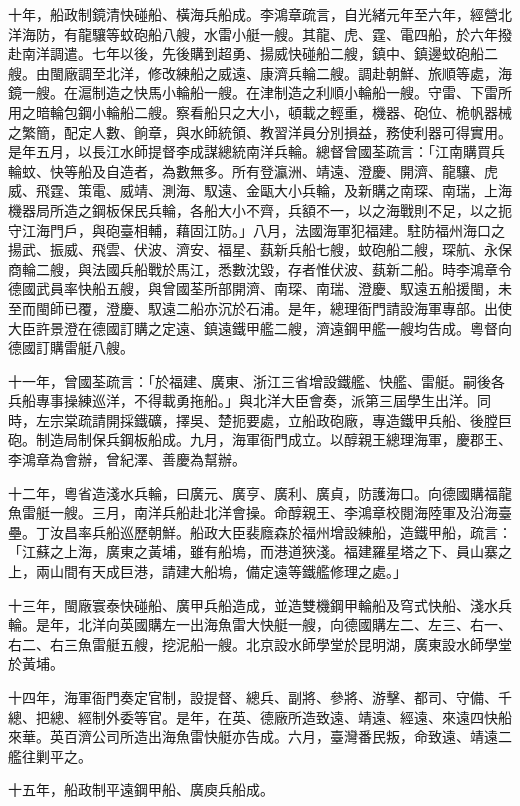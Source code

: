 \begin{pinyinscope}
十年，船政制鏡清快碰船、橫海兵船成。李鴻章疏言，自光緒元年至六年，經營北洋海防，有龍驤等蚊砲船八艘，水雷小艇一艘。其龍、虎、霆、電四船，於六年撥赴南洋調遣。七年以後，先後購到超勇、揚威快碰船二艘，鎮中、鎮邊蚊砲船二艘。由閩廠調至北洋，修改練船之威遠、康濟兵輪二艘。調赴朝鮮、旅順等處，海鏡一艘。在滬制造之快馬小輪船一艘。在津制造之利順小輪船一艘。守雷、下雷所用之暗輪包鋼小輪船二艘。察看船只之大小，頓載之輕重，機器、砲位、桅帆器械之繁簡，配定人數、餉章，與水師統領、教習洋員分別損益，務使利器可得實用。是年五月，以長江水師提督李成謀總統南洋兵輪。總督曾國荃疏言：「江南購買兵輪蚊、快等船及自造者，為數無多。所有登瀛洲、靖遠、澄慶、開濟、龍驤、虎威、飛霆、策電、威靖、測海、馭遠、金甌大小兵輪，及新購之南琛、南瑞，上海機器局所造之鋼板保民兵輪，各船大小不齊，兵額不一，以之海戰則不足，以之扼守江海門戶，與砲臺相輔，藉固江防。」八月，法國海軍犯福建。駐防福州海口之揚武、振威、飛雲、伏波、濟安、福星、蓺新兵船七艘，蚊砲船二艘，琛航、永保商輪二艘，與法國兵船戰於馬江，悉數沈毀，存者惟伏波、蓺新二船。時李鴻章令德國武員率快船五艘，與曾國荃所部開濟、南琛、南瑞、澄慶、馭遠五船援閩，未至而閩師已覆，澄慶、馭遠二船亦沉於石浦。是年，總理衙門請設海軍專部。出使大臣許景澄在德國訂購之定遠、鎮遠鐵甲艦二艘，濟遠鋼甲艦一艘均告成。粵督向德國訂購雷艇八艘。

十一年，曾國荃疏言：「於福建、廣東、浙江三省增設鐵艦、快艦、雷艇。嗣後各兵船專事操練巡洋，不得載勇拖船。」與北洋大臣會奏，派第三屆學生出洋。同時，左宗棠疏請開採鐵礦，擇吳、楚扼要處，立船政砲廠，專造鐵甲兵船、後膛巨砲。制造局制保兵鋼板船成。九月，海軍衙門成立。以醇親王總理海軍，慶郡王、李鴻章為會辦，曾紀澤、善慶為幫辦。

十二年，粵省造淺水兵輪，曰廣元、廣亨、廣利、廣貞，防護海口。向德國購福龍魚雷艇一艘。三月，南洋兵船赴北洋會操。命醇親王、李鴻章校閱海陸軍及沿海臺壘。丁汝昌率兵船巡歷朝鮮。船政大臣裴廕森於福州增設練船，造鐵甲船，疏言：「江蘇之上海，廣東之黃埔，雖有船塢，而港道狹淺。福建羅星塔之下、員山寨之上，兩山間有天成巨港，請建大船塢，備定遠等鐵艦修理之處。」

十三年，閩廠寰泰快碰船、廣甲兵船造成，並造雙機鋼甲輪船及穹式快船、淺水兵輪。是年，北洋向英國購左一出海魚雷大快艇一艘，向德國購左二、左三、右一、右二、右三魚雷艇五艘，挖泥船一艘。北京設水師學堂於昆明湖，廣東設水師學堂於黃埔。

十四年，海軍衙門奏定官制，設提督、總兵、副將、參將、游擊、都司、守備、千總、把總、經制外委等官。是年，在英、德廠所造致遠、靖遠、經遠、來遠四快船來華。英百濟公司所造出海魚雷快艇亦告成。六月，臺灣番民叛，命致遠、靖遠二艦往剿平之。

十五年，船政制平遠鋼甲船、廣庾兵船成。


\end{pinyinscope}
